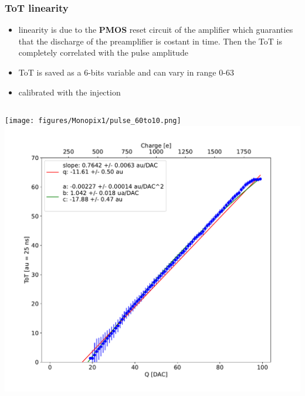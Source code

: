     \begin{frame}
        \frametitle{ToT linearity}
        \begin{itemize}
            \item linearity is due to the \textbf{PMOS} reset circuit of the amplifier which guaranties that the discharge of the preamplifier is costant in time. Then the ToT is completely correlated with the pulse amplitude 
            \item ToT is saved as a 6-bits variable and can vary in range 0-63
            \item calibrated with the injection
        \end{itemize}
        \medskip
        \medskip
        \medskip
        \begin{columns}
                \texttt{[image: figures/Monopix1/pulse\_60to10.png]}
                \includegraphics[width=.8\linewidth]{figures/charaterization/ToT_injection.pdf} 
        \end{columns}
    \end{frame}    

